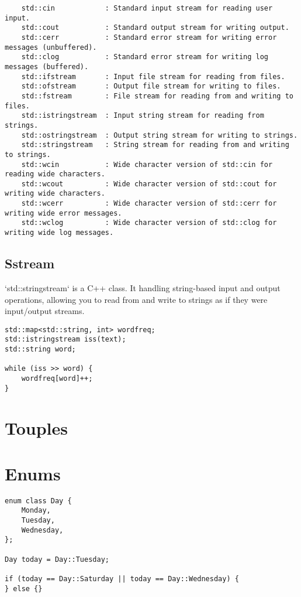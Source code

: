 \begin{verbatim}
    std::cin            : Standard input stream for reading user input.
    std::cout           : Standard output stream for writing output.
    std::cerr           : Standard error stream for writing error messages (unbuffered).
    std::clog           : Standard error stream for writing log messages (buffered).
    std::ifstream       : Input file stream for reading from files.
    std::ofstream       : Output file stream for writing to files.
    std::fstream        : File stream for reading from and writing to files.
    std::istringstream  : Input string stream for reading from strings.
    std::ostringstream  : Output string stream for writing to strings.
    std::stringstream   : String stream for reading from and writing to strings.
    std::wcin           : Wide character version of std::cin for reading wide characters.
    std::wcout          : Wide character version of std::cout for writing wide characters.
    std::wcerr          : Wide character version of std::cerr for writing wide error messages.
    std::wclog          : Wide character version of std::clog for writing wide log messages.
\end{verbatim}

\subsection{Sstream}

`std::stringstream` is a C++ class. It handling string-based input and output operations,
allowing you to read from and write to strings as if they were input/output streams.

\begin{verbatim}
std::map<std::string, int> wordfreq;
std::istringstream iss(text);
std::string word;

while (iss >> word) {
    wordfreq[word]++;
}
\end{verbatim}

\section{Touples}

\section{Enums}

\begin{verbatim}
enum class Day {
    Monday,
    Tuesday,
    Wednesday,
};

Day today = Day::Tuesday;

if (today == Day::Saturday || today == Day::Wednesday) {
} else {}
\end{verbatim}

